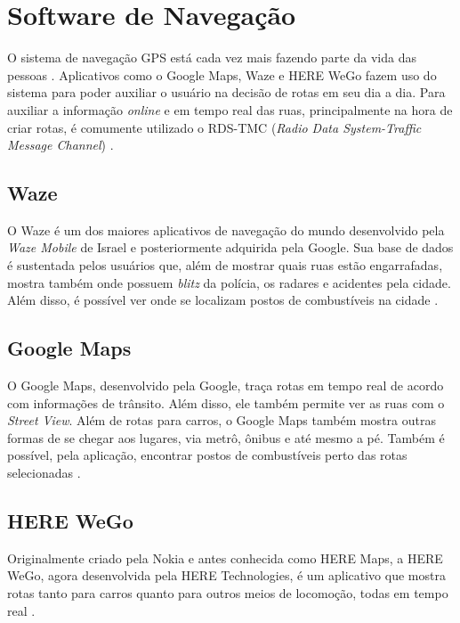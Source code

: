 \section{Software de Navegação}

O sistema de navegação GPS está cada vez mais fazendo parte da vida das pessoas \cite{gps-1}. Aplicativos como o Google Maps, Waze e HERE WeGo fazem uso do sistema para poder auxiliar o usuário na decisão de rotas em seu dia a dia. Para auxiliar a informação \textit{online} e em tempo real das ruas, principalmente na hora de criar rotas, é comumente utilizado o RDS-TMC (\textit{Radio Data System-Traffic Message Channel}) \cite{rds-tmc}.

\subsection{Waze}
O Waze é um dos maiores aplicativos de navegação do mundo desenvolvido pela \textit{Waze Mobile} de Israel e posteriormente adquirida pela Google. Sua base de dados é sustentada pelos usuários que, além de mostrar quais ruas estão engarrafadas, mostra também onde possuem \textit{blitz} da polícia, os radares e acidentes pela cidade. Além disso, é possível ver onde se localizam postos de combustíveis na cidade \cite{waze}.

\subsection{Google Maps}
O Google Maps, desenvolvido pela Google, traça rotas em tempo real de acordo com informações de trânsito. Além disso, ele também permite ver as ruas com o \textit{Street View}. Além de rotas para carros, o Google Maps também mostra outras formas de se chegar aos lugares, via metrô, ônibus e até mesmo a pé. Também é possível, pela aplicação, encontrar postos de combustíveis perto das rotas selecionadas \cite{google-maps}.

\subsection{HERE WeGo}
Originalmente criado pela Nokia e antes conhecida como HERE Maps, a HERE WeGo, agora desenvolvida pela HERE Technologies, é um aplicativo que mostra rotas tanto para carros quanto para outros meios de locomoção, todas em tempo real \cite{herewego}.
